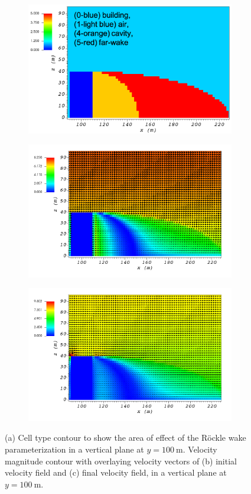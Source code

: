 \begin{figure}[H]
    \centering
    \begin{subfigure}{\textwidth}
    \centering
    \includegraphics[width=10.3cm,keepaspectratio]{Images/wake_y_100_1_init_icell.png}
    \caption{}
    \end{subfigure}
    \begin{subfigure}{\textwidth}
    \centering
    \includegraphics[width=11.0cm,keepaspectratio]{Images/wake_y_100_1_init_vel.png}
    \caption{}
    \end{subfigure}
    \begin{subfigure}{\textwidth}
    \centering
    \includegraphics[width=11.0cm,keepaspectratio]{Images/wake_y_100_1_final.png}
    \caption{}
    \end{subfigure}
    \caption{(a) Cell type contour to show the area of effect of the R\"{o}ckle wake parameterization in a vertical plane at $y=100\ \si{\meter}$. Velocity magnitude contour with overlaying velocity vectors of (b) initial velocity field and (c) final velocity field, in a vertical plane at $y=100\ \si{\meter}$.}
\end{figure}

